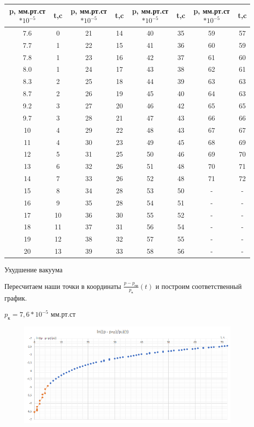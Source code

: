 \documentclass[12pt,a4paper]{article}
\begin{document}
\begin{enumerate}
\begin{center}
\begin{tabular}{|c|c|c|c|c|c|c|c|}
\hline 
p, мм.рт.ст$*10^{-5}$ & t,c & p, мм.рт.ст$*10^{-5}$ & t,c & p, мм.рт.ст$*10^{-5}$ & t,c & p, мм.рт.ст$*10^{-5}$ & t,c \\ 
\hline 
7.6 & 0 & 21 & 14 & 40 & 35 & 59 & 57 \\ 
\hline 
7.7 & 1 & 22 & 15 & 41 & 36 & 60 & 59 \\ 
\hline 
7.8 & 1 & 23 & 16 & 42 & 37 & 61 & 60 \\ 
\hline 
8.0 & 1 & 24 & 17 & 43 & 38 & 62 & 61 \\ 
\hline 
8.3 & 2 & 25 & 18 & 44 & 39 & 63 & 63 \\ 
\hline 
8.7 & 2 & 26 & 19 & 45 & 40 & 64 & 63 \\ 
\hline 
9.2 & 3 & 27 & 20 & 46 & 42 & 65 & 65 \\ 
\hline 
9.7 & 3 & 28 & 21 & 47 & 43 & 66 & 66 \\ 
\hline 
10 & 4 & 29 & 22 & 48 & 43 & 67 & 67 \\ 
\hline 
11 & 4 & 30 & 23 & 49 & 45 & 68 & 69 \\ 
\hline 
12 & 5 & 31 & 25 & 50 & 46 & 69 & 70 \\ 
\hline 
13 & 6 & 32 & 26 & 51 & 48 & 70 & 71 \\ 
\hline 
14 & 7 & 33 & 26 & 52 & 48 & 71 & 72 \\ 
\hline 
15 & 8 & 34 & 28 & 53 & 50 & - & - \\ 
\hline 
16 & 9 & 35 & 28 & 54 & 51 & - & - \\ 
\hline 
17 & 10 & 36 & 30 & 55 & 52 & - & - \\ 
\hline 
18 & 11 & 37 & 31 & 56 & 54 & - & - \\ 
\hline 
19 & 12 & 38 & 32 & 57 & 55 & - & - \\ 
\hline 
20 & 13 & 39 & 33 & 58 & 56 & - & - \\ 
\hline 
\end{tabular} 
Ухудшение вакуума
\end{center} 
Пересчитаем наши точки в координаты $\frac{p - p_{\text{пр}}}{p_{\text{к}}}(t)$ и построим соответственный график.

$p_{\text{к}} = 7,6*10^{-5}$ мм.рт.ст

\begin{figure}[H]
	\begin{center}
		\includegraphics[width=14cm]{2.3.1_gr_1}
	\end{center}
	\label{ris8}
\end{figure}



\end{enumerate}
\end{document}
